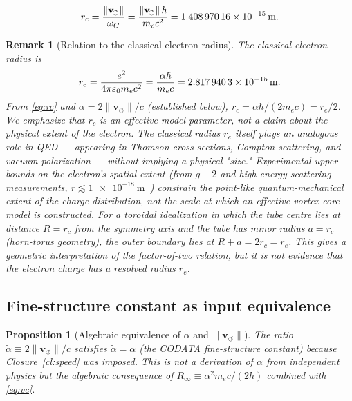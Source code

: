 \documentclass[aps,pra,preprint,longbibliography,nofootinbib]{revtex4-2}
\newtheorem{proposition}{Proposition}
\newtheorem{remark}{Remark}
\newcommand{\vnorm}{\lVert\mathbf{v}_{\!\boldsymbol{\circlearrowleft}}\rVert} %
\newcommand{\rc}{r_c}                            %
\newcommand{\omC}{\omega_C}                      %
\newcommand{\Rinf}{R_\infty}                     %
\begin{document}
\begin{equation}
  \rc = \frac{\vnorm}{\omC} = \frac{\vnorm\,\hbar}{m_e c^2}
      = \SI{1.408\,970\,16e-15}{\meter}.
  \label{eq:rc}
\end{equation}

\begin{remark}[Relation to the classical electron radius]
\label{rem:re}
The classical electron radius is
\begin{equation}
  r_e = \frac{e^2}{4\pi\varepsilon_0 m_e c^2}
      = \frac{\alpha\hbar}{m_e c}
      = \SI{2.817\,940\,3e-15}{\meter}.
  \label{eq:re}
\end{equation}
From \eqref{eq:rc} and $\alpha = 2\vnorm/c$ (established below),
$\rc = \alpha\hbar/(2m_e c) = r_e/2$.
We emphasize that $\rc$ is an \emph{effective model parameter},
not a claim about the physical extent of the electron.
The classical radius $r_e$ itself plays an analogous role in QED
— appearing in Thomson cross-sections, Compton scattering, and
vacuum polarization — without implying a physical "size."
Experimental upper bounds on the electron's spatial extent
(from $g{-}2$ and high-energy scattering measurements,
$r \lesssim \SI{1e-18}{\meter}$~\cite{PDG2022}) constrain the
\emph{point-like} quantum-mechanical extent of the charge
distribution, not the scale at which an effective vortex-core
model is constructed.
For a toroidal idealization in which the tube centre lies at distance
$R = \rc$ from the symmetry axis and the tube has minor radius
$a = \rc$ (horn-torus geometry), the outer boundary lies at
$R+a=2\rc=r_e$.  This gives a geometric interpretation of the
factor-of-two relation, but it is not evidence that the electron charge
has a resolved radius $r_e$.
\end{remark}

\subsection{Fine-structure constant as input equivalence}
\label{sec:alpha}

\begin{proposition}[Algebraic equivalence of $\alpha$ and $\vnorm$]
\label{prop:alpha}
The ratio $\tilde\alpha \equiv 2\vnorm/c$
satisfies $\tilde\alpha = \alpha$ (the CODATA fine-structure
constant) because Closure~\ref{cl:speed} was imposed.
This is not a derivation of $\alpha$ from independent physics
but the algebraic consequence of $\Rinf \equiv \alpha^2 m_e c/(2h)$
combined with \eqref{eq:vc}.
\end{proposition}
\end{document}

